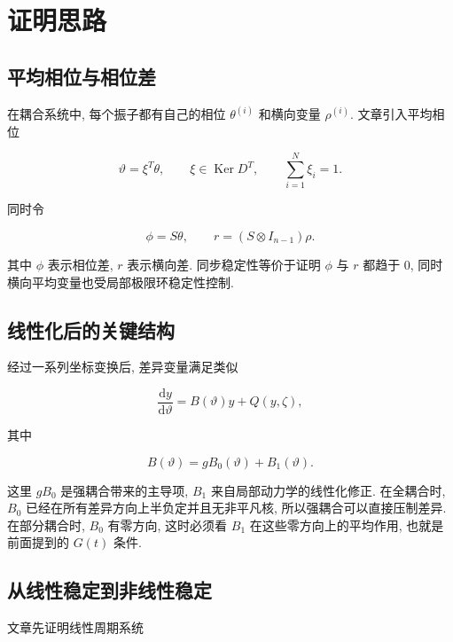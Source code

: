 \documentclass[oneside]{ctexart}
\DeclareMathOperator{\Ker}{Ker}
\newcommand{\dd}{\mathrm{d}}
\begin{document}
\section{证明思路}

\subsection{平均相位与相位差}

在耦合系统中, 每个振子都有自己的相位 $\theta^{(i)}$ 和横向变量 $\rho^{(i)}$. 文章引入平均相位

\begin{equation}
    \vartheta=\xi^T\theta,
    \qquad
    \xi\in \Ker D^T,
    \qquad
    \sum_{i=1}^N \xi_i=1.
\end{equation}

同时令

\begin{equation}
    \phi=S\theta,\qquad r=(S\otimes I_{n-1})\rho.
\end{equation}

其中 $\phi$ 表示相位差, $r$ 表示横向差. 同步稳定性等价于证明 $\phi$ 与 $r$ 都趋于 $0$, 同时横向平均变量也受局部极限环稳定性控制.

\subsection{线性化后的关键结构}

经过一系列坐标变换后, 差异变量满足类似

\begin{equation}
    \dfrac{\dd y}{\dd \vartheta}=B(\vartheta)y+Q(y,\zeta),
\end{equation}

其中

\begin{equation}
    B(\vartheta)=gB_0(\vartheta)+B_1(\vartheta).
\end{equation}

这里 $gB_0$ 是强耦合带来的主导项, $B_1$ 来自局部动力学的线性化修正. 在全耦合时, $B_0$ 已经在所有差异方向上半负定并且无非平凡核, 所以强耦合可以直接压制差异. 在部分耦合时, $B_0$ 有零方向, 这时必须看 $B_1$ 在这些零方向上的平均作用, 也就是前面提到的 $G(t)$ 条件.

\subsection{从线性稳定到非线性稳定}

文章先证明线性周期系统
\end{document}
